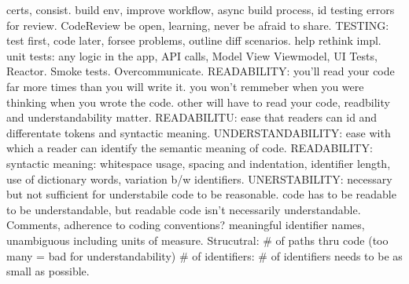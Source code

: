 \documentclass[10pt]{article}
\begin{document}
\begin{landscape}
\begin{multicols*}{6}
certs, consist. build env, improve workflow, async build process, id testing errors for review. CodeReview be open, learning, never be afraid to share. TESTING: test first, code later, forsee problems, outline diff scenarios. help rethink impl. unit tests: any logic in the app, API calls, Model View Viewmodel, UI Tests, Reactor. Smoke tests. Overcommunicate. READABILITY: you'll read your code far more times than you will write it. you won't remmeber when you were thinking when you wrote the code. other will have to read your code, readbility and understandability matter. READABILITU: ease that readers can id and differentate tokens and syntactic meaning. UNDERSTANDABILITY: ease with which a reader can identify the semantic meaning of code. READABILITY: syntactic meaning: whitespace usage, spacing and indentation, identifier length, use of dictionary words, variation b/w identifiers. UNERSTABILITY: necessary but not sufficient for understabile code to be reasonable. code has to be readable to be understandable, but readable code isn't necessarily understandable. Comments, adherence to coding conventions? meaningful identifier names, unambiguous including units of measure. Strucutral: \# of paths thru code (too many = bad for understandability) \# of identifiers: \# of identifiers needs to be as small as possible.


\end{multicols*}
\end{landscape}
\end{document}

